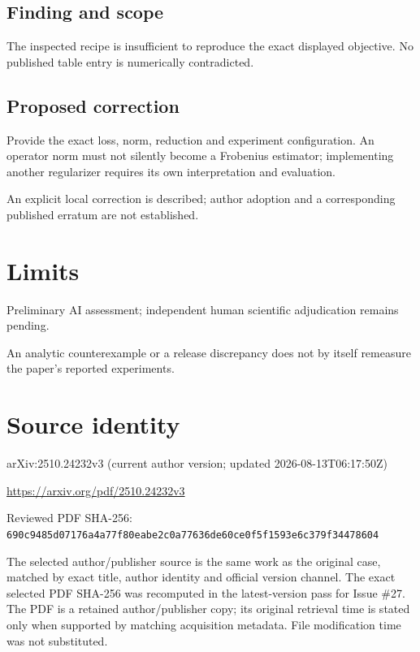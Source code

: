 \documentclass[11pt]{article}
\begin{document}
\subsection*{Finding and scope}

The inspected recipe is insufficient to reproduce the exact displayed objective. No published table entry is numerically contradicted.

\subsection*{Proposed correction}

Provide the exact loss, norm, reduction and experiment configuration. An operator norm must not silently become a Frobenius estimator; implementing another regularizer requires its own interpretation and evaluation.

An explicit local correction is described; author adoption and a corresponding published erratum are not established.

\section*{Limits}

Preliminary AI assessment; independent human scientific adjudication remains pending.\par

An analytic counterexample or a release discrepancy does not by itself remeasure the paper’s reported experiments.\par

\section*{Source identity}

arXiv:2510.24232v3 (current author version; updated 2026-08-13T06:17:50Z)

\url{https://arxiv.org/pdf/2510.24232v3}

Reviewed PDF SHA-256: \nolinkurl{690c9485d07176a4a77f80eabe2c0a77636de60ce0f5f1593e6c379f34478604}

The selected author/publisher source is the same work as the original case, matched by exact title, author identity and official version channel. The exact selected PDF SHA-256 was recomputed in the latest-version pass for Issue \#27. The PDF is a retained author/publisher copy; its original retrieval time is stated only when supported by matching acquisition metadata. File modification time was not substituted.
\end{document}
